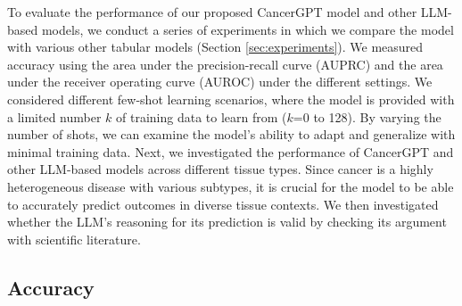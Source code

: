 {To evaluate the performance of our proposed CancerGPT model and other LLM-based models, we conduct a series of experiments in which we compare the model with various other tabular models (Section \ref{sec:experiments}). We measured accuracy using the area under the precision-recall curve (AUPRC) and the area under the receiver operating curve (AUROC) under the different settings. We considered different few-shot learning scenarios, where the model is provided with a limited number $k$ of training data to learn from ($k$=0 to 128). By varying the number of shots, we can examine the model's ability to adapt and generalize with minimal training data. 
Next, we investigated the performance of CancerGPT and other LLM-based models across different tissue types. Since cancer is a highly heterogeneous disease with various subtypes, it is crucial for the model to be able to accurately predict outcomes in diverse tissue contexts. We then investigated whether the LLM's reasoning for its prediction is valid by checking its argument with scientific literature. 

\subsection{Accuracy}

}
